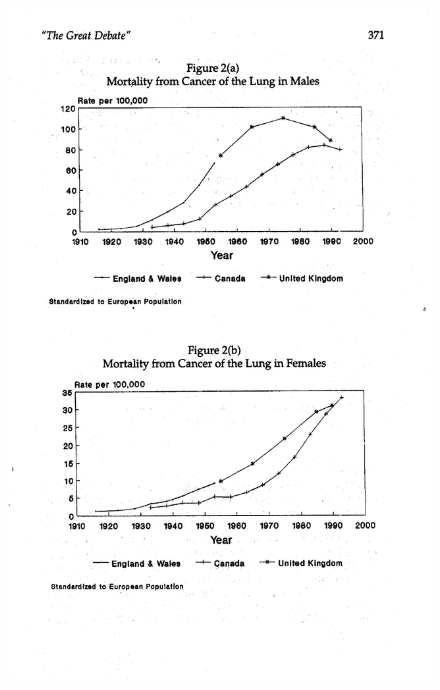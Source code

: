 \documentclass{beamer}
\begin{document}
\begin{frame}[plain, shrink=20]
	\begin{figure}
	\includegraphics[scale=0.75]{./lecture_includes/cancer_fig2.pdf}
	\end{figure}

\end{frame}	
\end{document}
